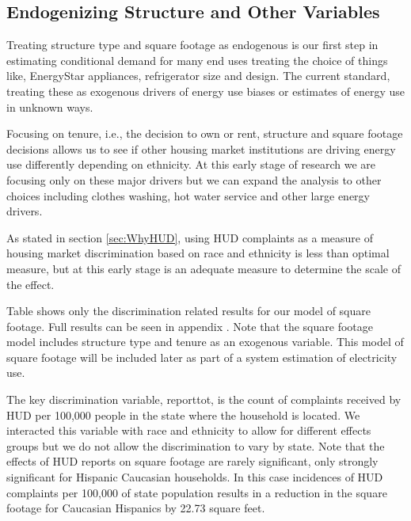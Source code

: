 \documentclass{article}
\begin{document}
\subsection{Endogenizing Structure and Other Variables}\label{sec:SingleEq}

Treating structure type and square footage as endogenous is our first step in estimating conditional demand for many end uses treating the choice of things like, EnergyStar appliances, refrigerator size and design.  The current standard, treating these as exogenous drivers of energy use biases or estimates of energy use in unknown ways.

Focusing on tenure, i.e., the decision to own or rent, structure and square footage decisions allows us to see if other housing market institutions are driving energy use differently depending on ethnicity.  At this early stage of research we are focusing only on these major drivers but we can expand the analysis to other choices including clothes washing, hot water service and other large energy drivers.

As stated in section \ref{sec:WhyHUD}, using HUD complaints as a measure of housing market discrimination based on race and ethnicity is less than optimal measure, but at this early stage is an adequate measure to determine the scale of the effect.  


Table 
shows only the discrimination related results for our model of square footage.  Full results can be seen in appendix 
.   Note that the square footage model includes structure type and tenure as an exogenous variable.  This model of square footage will be included later as part of a system estimation of electricity use.   

The key discrimination variable, reporttot, is the count of complaints received by HUD per 100,000 people in the state where the household is located. We interacted this variable with race and ethnicity to allow for different effects  groups but we do not allow the discrimination to vary by state. Note that the effects of HUD reports on square footage are rarely significant, only strongly significant for Hispanic Caucasian households.  In this case incidences of HUD complaints per 100,000 of state population results in a reduction in the square footage for Caucasian Hispanics by 22.73 square feet.


\end{document}
